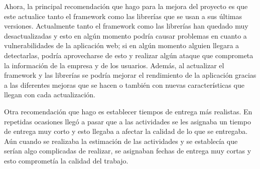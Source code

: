 Ahora, la principal recomendación que hago para la mejora del proyecto es que este actualice tanto el framework como las librerías que se usan a sus últimas versiones. Actualmente tanto el framework como las librerías han quedado muy desactualizadas y esto en algún momento podría causar problemas en cuanto a vulnerabilidades de la aplicación web; si en algún momento alguien llegara a detectarlas, podría aprovecharse de esto y realizar algún ataque que comprometa la información de la empresa y de los usuarios. Además, al actualizar el framework y las librerías se podría mejorar el rendimiento de la aplicación gracias a las diferentes mejoras que se hacen o también con nuevas características que llegan con cada actualización.

Otra recomendación que hago es establecer tiempos de entrega más realistas. En repetidas ocasiones llegó a pasar que a las actividades se les asignaba un tiempo de entrega muy corto y esto llegaba a afectar la calidad de lo que se entregaba. Aún cuando se realizaba la estimación de las actividades y se establecía que serían algo complicadas de realizar, se asignaban fechas de entrega muy cortas y esto comprometía la calidad del trabajo. 

